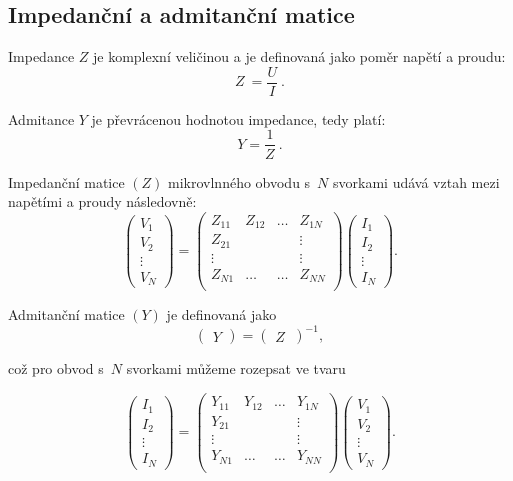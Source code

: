 \documentclass{protokol}
\begin{document}
\subsection{Impedanční a admitanční matice}

Impedance $Z$ je komplexní veličinou a je definovaná jako poměr napětí a proudu:
\begin{equation}
	Z~= \frac{U}{I} \:.
\end{equation}

Admitance $Y$ je převrácenou hodnotou impedance, tedy platí:
\begin{equation}
	Y = \frac{1}{Z} \:.
\end{equation}

Impedanční matice $(Z)$ mikrovlnného obvodu s~$N$ svorkami
udává vztah mezi napětími a proudy následovně:
\[
\begin{pmatrix}
	V_1     \\
	V_2		\\
	\vdots	\\
	V_N
\end{pmatrix}
=
\begin{pmatrix}
	Z_{11} & Z_{12} & \dots & Z_{1N}   \\
	Z_{21} &		& 		& \vdots	\\
	\vdots &		& 		& \vdots	\\
	Z_{N1} & \dots	& \dots & Z_{NN} 	\\
\end{pmatrix}
%
\begin{pmatrix}
	I_1     \\
	I_2		\\
	\vdots	\\
	I_N
\end{pmatrix}
.\]

Admitanční matice $(Y)$ je definovaná jako
\[
\begin{pmatrix}
	Y
\end{pmatrix}
=
\begin{pmatrix}
	Z~\end{pmatrix}^{-1}
,\]

což pro obvod s~$N$ svorkami můžeme rozepsat ve tvaru

\[
\begin{pmatrix}
	I_1     \\
	I_2		\\
	\vdots	\\
	I_N
\end{pmatrix}
=
\begin{pmatrix}
	Y_{11} & Y_{12} & \dots & Y_{1N}   \\
	Y_{21} &		& 		& \vdots	\\
	\vdots &		& 		& \vdots	\\
	Y_{N1} & \dots	& \dots & Y_{NN} 	\\
\end{pmatrix}
%
\begin{pmatrix}
	V_1     \\
	V_2		\\
	\vdots	\\
	V_N
\end{pmatrix}
.\]
\end{document}
